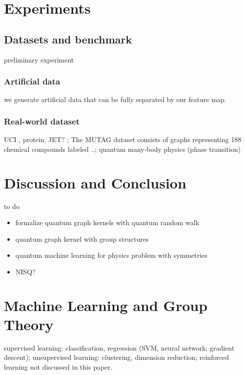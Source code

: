\section{Experiments}\label{sec:experiments}

\subsection{Datasets and benchmark}
preliminary experiment

\subsubsection{Artificial data}
we generate artificial data that can be fully separated by our feature map.

\subsubsection{Real-world dataset}
UCI \cite{kondorDiffusionKernelsGraphs2002}, protein, JET? \cite{bogatskiyLorentzGroupEquivariant2020}; 
The MUTAG dataset consists of graphs representing 188 chemical compounds labeled ..;
quantum many-body physics (phase transition)
\cite{carrasquillaMachineLearningPhases2017} 

\section{Discussion and Conclusion}\label{sec:discussion}
to do 
\begin{itemize}
	\item formalize quantum graph kernels with quantum random walk
	\item quantum graph kernel with group structures
	\item quantum machine learning for physics problem with symmetries
	\item NISQ?
\end{itemize}

\printbibliography
\appendix

\section{Machine Learning and Group Theory}
supervised learning: classification, regression
(SVM, neural network; gradient descent);
unsupervised learning: clustering, dimension reduction;
reinforced learning not discussed in this paper.
